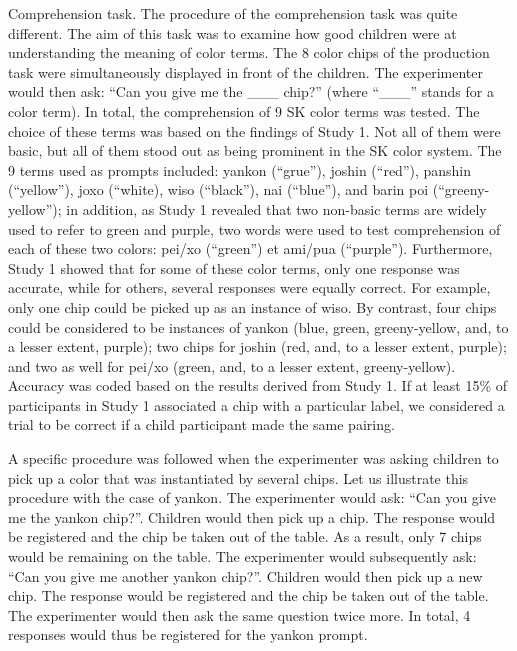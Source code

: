 \documentclass[man]{apa6}
\theoremstyle{definition}
\theoremstyle{definition}
\theoremstyle{definition}
\theoremstyle{remark}
\begin{document}
Comprehension task. The procedure of the comprehension task was quite
different. The aim of this task was to examine how good children were at
understanding the meaning of color terms. The 8 color chips of the
production task were simultaneously displayed in front of the children.
The experimenter would then ask: \enquote{Can you give me the \_\_\_
chip?} (where ``\_\_\_'' stands for a color term). In total, the
comprehension of 9 SK color terms was tested. The choice of these terms
was based on the findings of Study 1. Not all of them were basic, but
all of them stood out as being prominent in the SK color system. The 9
terms used as prompts included: yankon (\enquote{grue}), joshin
(\enquote{red}), panshin (\enquote{yellow}), joxo (``white), wiso
(\enquote{black}), nai (\enquote{blue}), and barin poi
(\enquote{greeny-yellow}); in addition, as Study 1 revealed that two
non-basic terms are widely used to refer to green and purple, two words
were used to test comprehension of each of these two colors: pei/xo
(\enquote{green}) et ami/pua (\enquote{purple}). Furthermore, Study 1
showed that for some of these color terms, only one response was
accurate, while for others, several responses were equally correct. For
example, only one chip could be picked up as an instance of wiso. By
contrast, four chips could be considered to be instances of yankon
(blue, green, greeny-yellow, and, to a lesser extent, purple); two chips
for joshin (red, and, to a lesser extent, purple); and two as well for
pei/xo (green, and, to a lesser extent, greeny-yellow). Accuracy was
coded based on the results derived from Study 1. If at least 15\% of
participants in Study 1 associated a chip with a particular label, we
considered a trial to be correct if a child participant made the same
pairing.

A specific procedure was followed when the experimenter was asking
children to pick up a color that was instantiated by several chips. Let
us illustrate this procedure with the case of yankon. The experimenter
would ask: \enquote{Can you give me the yankon chip?}. Children would
then pick up a chip. The response would be registered and the chip be
taken out of the table. As a result, only 7 chips would be remaining on
the table. The experimenter would subsequently ask: \enquote{Can you
give me another yankon chip?}. Children would then pick up a new chip.
The response would be registered and the chip be taken out of the table.
The experimenter would then ask the same question twice more. In total,
4 responses would thus be registered for the yankon prompt.
\end{document}
